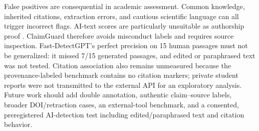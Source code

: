 \documentclass[12pt,toc=bib,toc=listof]{scrartcl}
\begin{document}
False positives are consequential in academic assessment. Common knowledge, inherited citations, extraction errors, and cautious scientific language can all trigger incorrect flags. AI-text scores are particularly unsuitable as authorship proof \cite{sadasivan2023,weberwulff2023}. ClaimGuard therefore avoids misconduct labels and requires source inspection. Fast-DetectGPT's perfect precision on 15 human passages must not be generalized: it missed 7/15 generated passages, and edited or paraphrased text was not tested. Citation association also remains unmeasured because the provenance-labeled benchmark contains no citation markers; private student reports were not transmitted to the external API for an exploratory analysis. Future work should add double annotation, authentic claim--source labels, broader DOI/retraction cases, an external-tool benchmark, and a consented, preregistered AI-detection test including edited/paraphrased text and citation behavior.
\end{document}
